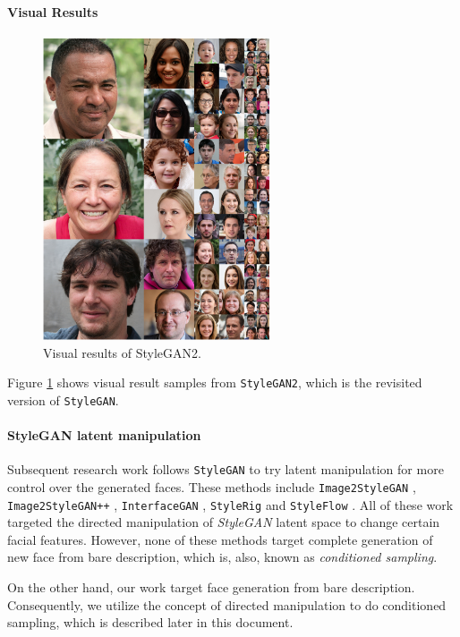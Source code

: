 \paragraph{Visual Results}
\begin{figure}[H]
    \centering
    \includegraphics[width=0.6\textwidth]{images/stylegan-results.png}
    \caption{Visual results of StyleGAN2.}
    \label{fig:stgan_res}
\end{figure}

Figure \ref{fig:stgan_res} shows visual result samples from \texttt{StyleGAN2}, which is the revisited version of \texttt{StyleGAN}.

\paragraph{StyleGAN latent manipulation}
Subsequent research work follows \texttt{StyleGAN} to try latent manipulation for more control over the generated faces. These methods include \texttt{Image2StyleGAN} \cite{abdal2019image2stylegan}, \texttt{Image2StyleGAN++} \cite{abdal2020image2stylegan}, \texttt{InterfaceGAN} \cite{shen2020interfacegan}, \texttt{StyleRig} \cite{tewari2020stylerig} and \texttt{StyleFlow} \cite{abdal2020styleflow}. All of these work targeted the directed manipulation of \emph{StyleGAN} latent space to change certain facial features. However, none of these methods target complete generation of new face from bare description, which is, also, known as \emph{conditioned sampling}. 

On the other hand, our work target face generation from bare description. Consequently, we utilize the concept of directed manipulation to do conditioned sampling, which is described later in this document.

